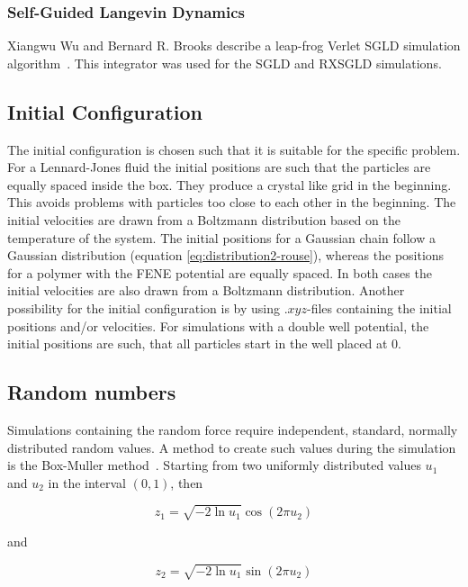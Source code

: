 \documentclass[a4paper]{article}
\begin{document}
\subsubsection{Self-Guided Langevin Dynamics}

Xiangwu Wu and Bernard R. Brooks describe a leap-frog Verlet SGLD simulation algorithm~\cite{XiongwuWu2011a}. This integrator was used for the SGLD and RXSGLD simulations.

\subsection{Initial Configuration}

The initial configuration is chosen such that it is suitable for the specific problem. For a Lennard-Jones fluid the initial positions are such that the particles are equally spaced inside the box. They produce a crystal like grid in the beginning. This avoids problems with particles too close to each other in the beginning. The initial velocities are drawn from a Boltzmann distribution based on the temperature of the system. The initial positions for a Gaussian chain follow a Gaussian distribution (equation \ref{eq:distribution2-rouse}), whereas the positions for a polymer with the FENE potential are equally spaced. In both cases the initial velocities are also drawn from a Boltzmann distribution. Another possibility for the initial configuration is by using $.xyz$-files containing the initial positions and/or velocities. For simulations with a double well potential, the initial positions are such, that all particles start in the well placed at 0.

\subsection{Random numbers}

Simulations containing the random force require independent, standard, normally distributed random values. A method to create such values during the simulation is the Box-Muller method~\cite{Box1958}. Starting from two uniformly distributed values $u_1$ and $u_2$ in the interval $(0,1)$, then

\begin{equation}
z_1 = \sqrt{-2 \ln u_1} \cos (2 \pi u_2)
\end{equation}

and

\begin{equation}
z_2 = \sqrt{-2 \ln u_1} \sin (2 \pi u_2)
\end{equation}
\end{document}
